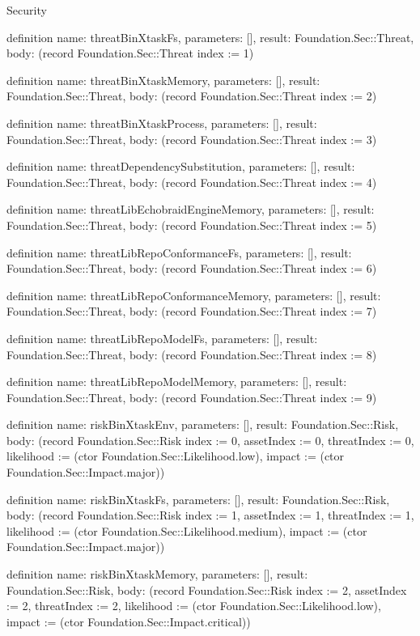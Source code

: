 \begin{lexlean}{Security}
\begin{semanticmodule}
definition{
  name: threatBinXtaskFs,
  parameters: [],
  result: Foundation.Sec::Threat,
  body: (record Foundation.Sec::Threat {index := 1})
}

definition{
  name: threatBinXtaskMemory,
  parameters: [],
  result: Foundation.Sec::Threat,
  body: (record Foundation.Sec::Threat {index := 2})
}

definition{
  name: threatBinXtaskProcess,
  parameters: [],
  result: Foundation.Sec::Threat,
  body: (record Foundation.Sec::Threat {index := 3})
}

definition{
  name: threatDependencySubstitution,
  parameters: [],
  result: Foundation.Sec::Threat,
  body: (record Foundation.Sec::Threat {index := 4})
}

definition{
  name: threatLibEchobraidEngineMemory,
  parameters: [],
  result: Foundation.Sec::Threat,
  body: (record Foundation.Sec::Threat {index := 5})
}

definition{
  name: threatLibRepoConformanceFs,
  parameters: [],
  result: Foundation.Sec::Threat,
  body: (record Foundation.Sec::Threat {index := 6})
}

definition{
  name: threatLibRepoConformanceMemory,
  parameters: [],
  result: Foundation.Sec::Threat,
  body: (record Foundation.Sec::Threat {index := 7})
}

definition{
  name: threatLibRepoModelFs,
  parameters: [],
  result: Foundation.Sec::Threat,
  body: (record Foundation.Sec::Threat {index := 8})
}

definition{
  name: threatLibRepoModelMemory,
  parameters: [],
  result: Foundation.Sec::Threat,
  body: (record Foundation.Sec::Threat {index := 9})
}

definition{
  name: riskBinXtaskEnv,
  parameters: [],
  result: Foundation.Sec::Risk,
  body: (record Foundation.Sec::Risk {index := 0, assetIndex := 0, threatIndex := 0, likelihood := (ctor Foundation.Sec::Likelihood.low), impact := (ctor Foundation.Sec::Impact.major)})
}

definition{
  name: riskBinXtaskFs,
  parameters: [],
  result: Foundation.Sec::Risk,
  body: (record Foundation.Sec::Risk {index := 1, assetIndex := 1, threatIndex := 1, likelihood := (ctor Foundation.Sec::Likelihood.medium), impact := (ctor Foundation.Sec::Impact.major)})
}

definition{
  name: riskBinXtaskMemory,
  parameters: [],
  result: Foundation.Sec::Risk,
  body: (record Foundation.Sec::Risk {index := 2, assetIndex := 2, threatIndex := 2, likelihood := (ctor Foundation.Sec::Likelihood.low), impact := (ctor Foundation.Sec::Impact.critical)})
}


\end{semanticmodule}
\end{lexlean}

